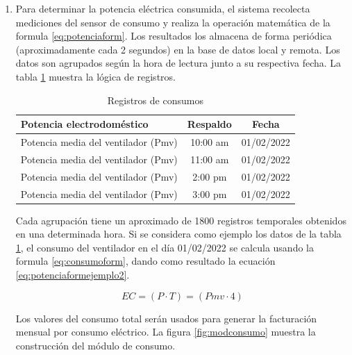 \begin{enumerate}
\item {}

Para determinar la potencia eléctrica consumida, el sistema recolecta mediciones del sensor de consumo y realiza la operación matemática de la formula \ref{eq:potenciaform}. Los resultados los almacena de forma periódica (aproximadamente cada 2 segundos) en la base de datos local y remota. Los datos son agrupados según la hora de lectura junto a su respectiva fecha. La tabla \ref{tab:tablaconsumos} muestra la lógica de registros.




\begin{table}[h]
	\centering
	\caption[Registros de consumos]{Registros de consumos}
	\begin{tabular}{l c c }     
		\toprule
		\textbf{Potencia electrodoméstico} & \textbf{Respaldo} &\textbf{Fecha} \\
		\midrule
		Potencia media del ventilador (Pmv) & 10:00 am & 01/02/2022\\		
		Potencia media del ventilador (Pmv) & 11:00 am &01/02/2022 \\
		Potencia media del ventilador (Pmv) & 2:00 pm & 01/02/2022\\		
		Potencia media del ventilador (Pmv) & 3:00 pm & 01/02/2022\\		
		
		\bottomrule
		\hline
	\end{tabular}
	\label{tab:tablaconsumos}
\end{table}

Cada agrupación tiene un aproximado de 1800 registros temporales obtenidos en una determinada hora. Si se considera como ejemplo los datos de la tabla \ref{tab:tablaconsumos}, el consumo del ventilador en el día 01/02/2022 se calcula usando la formula \ref{eq:consumoform}, dando como resultado la ecuación \ref{eq:potenciaformejemplo2}.

\begin{equation}
	\label{eq:potenciaformejemplo2}
	EC =  \left( P \cdot T \right) = \left(Pmv \cdot 4 \right)
\end{equation}

Los valores del consumo total serán usados para generar la facturación mensual por consumo eléctrico. La figura \ref{fig:modconsumo} muestra la construcción del módulo de consumo.


\end{enumerate}
